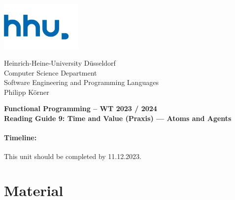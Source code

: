 \documentclass[11pt,a4paper]{article}
\begin{document}
\begin{minipage}[b]{\textwidth}
	\parbox[t]{5cm}{%
		\includegraphics[width=4cm]{unilogo}
		\hfill
	}
	\parbox[b]{11cm}{%
		Heinrich-Heine-University D\"usseldorf\\
		Computer Science Department\\
		Software Engineering and Programming Languages\\
		Philipp K\"orner
	}
\end{minipage}
\begin{center}
	\bf
	Functional Programming -- WT 2023 / 2024\\
	Reading Guide 9: Time and Value (Praxis) --- Atoms and Agents
\end{center}

\pagestyle{empty}

\paragraph{Timeline:} This unit should be completed by 11.12.2023.

\section{Material} 
\end{document}

